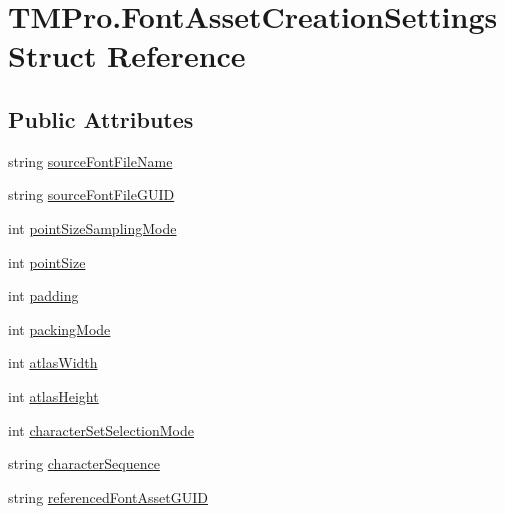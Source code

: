 \hypertarget{struct_t_m_pro_1_1_font_asset_creation_settings}{}\section{T\+M\+Pro.\+Font\+Asset\+Creation\+Settings Struct Reference}
\label{struct_t_m_pro_1_1_font_asset_creation_settings}
\subsection*{Public Attributes}
\begin{DoxyCompactItemize}
\item 
string \mbox{\hyperlink{struct_t_m_pro_1_1_font_asset_creation_settings_ad6a59cfd2d18f616e4ac8596bd8136b7}{source\+Font\+File\+Name}}
\item 
string \mbox{\hyperlink{struct_t_m_pro_1_1_font_asset_creation_settings_a07c8faf8e4d29ad094d00bb13055b3dd}{source\+Font\+File\+G\+U\+ID}}
\item 
int \mbox{\hyperlink{struct_t_m_pro_1_1_font_asset_creation_settings_a13a213077e6906106891a6bb72a1a7e8}{point\+Size\+Sampling\+Mode}}
\item 
int \mbox{\hyperlink{struct_t_m_pro_1_1_font_asset_creation_settings_a7d75d277e358756ed55a1111f121d5b7}{point\+Size}}
\item 
int \mbox{\hyperlink{struct_t_m_pro_1_1_font_asset_creation_settings_aa761d512b9491bb6cff25f2de115a090}{padding}}
\item 
int \mbox{\hyperlink{struct_t_m_pro_1_1_font_asset_creation_settings_a688a1e8d0b7d6be9603dc27c3293d120}{packing\+Mode}}
\item 
int \mbox{\hyperlink{struct_t_m_pro_1_1_font_asset_creation_settings_af3d6fda766d7b2e538de511f69f3c4f6}{atlas\+Width}}
\item 
int \mbox{\hyperlink{struct_t_m_pro_1_1_font_asset_creation_settings_a61efaa2cb1ade42549ae6b9e358aa20c}{atlas\+Height}}
\item 
int \mbox{\hyperlink{struct_t_m_pro_1_1_font_asset_creation_settings_a5e57760ba4cfceef85406ba50b769396}{character\+Set\+Selection\+Mode}}
\item 
string \mbox{\hyperlink{struct_t_m_pro_1_1_font_asset_creation_settings_a4c9b264dfbe67cf4beb0b0b68945b4e4}{character\+Sequence}}
\item 
string \mbox{\hyperlink{struct_t_m_pro_1_1_font_asset_creation_settings_a2268b75806936bca649454de1a31c522}{referenced\+Font\+Asset\+G\+U\+ID}}

\end{DoxyCompactItemize}
